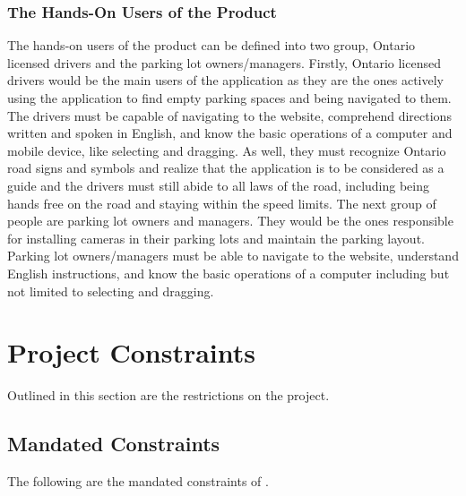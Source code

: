 \documentclass[12pt,letterpaper]{article}
\begin{document}
\subsubsection{The Hands-On Users of the Product}
The hands-on users of the product can be defined into two group, Ontario licensed drivers and the parking lot owners/managers. Firstly, Ontario licensed drivers would be the main users of the application as they are the ones actively using the application to find empty parking spaces and being navigated to them. The drivers must be capable of navigating to the website, comprehend directions written and spoken in English, and know the basic operations of a computer and mobile device, like selecting and dragging. As well, they must recognize Ontario road signs and symbols and realize that the application is to be considered as a guide and the drivers must still abide to all laws of the road, including being hands free on the road and staying within the speed limits. The next group of people are parking lot owners and managers. They would be the ones responsible for installing cameras in their parking lots and maintain the parking layout. Parking lot owners/managers must be able to navigate to the website, understand English instructions, and know the basic operations of a computer including but not limited to selecting and dragging.

\newpage
\section{Project Constraints}
Outlined in this section are the restrictions on the project.
\subsection{Mandated Constraints}
The following are the mandated constraints of \progname.
\end{document}
